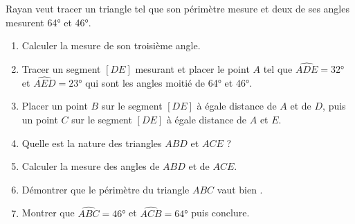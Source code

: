 \begin{Maquette}[Fiche,CorrigeFin,Colonnes=2]{}
\begin{multicols}{2}
      
      \begin{exercice}[Dur] %
         Rayan veut tracer un triangle tel que son périmètre mesure  et deux de ses angles mesurent \ang{64} et \ang{46}.
         \begin{enumerate}
            \item Calculer la mesure de son troisième angle.
            \item Tracer un segment $[DE]$ mesurant  et placer le point $A$ tel que $\widehat{ADE} =\ang{32}$ et $\widehat{AED} =\ang{23}$ qui sont les angles moitié de \ang{64} et \ang{46}.
            \item Placer un point $B$ sur le segment $[DE]$ à égale distance de $A$ et de $D$, puis un point $C$ sur le segment $[DE]$ à égale distance de $A$ et $E$. 
            \item Quelle est la nature des triangles $ABD$ et $ACE$ ?
            \item Calculer la mesure des angles de $ABD$ et de $ACE$.
            \item Démontrer que le périmètre du triangle $ABC$ vaut bien .
            \item Montrer que $\widehat{ABC} =\ang{46}$ et $\widehat{ACB} =\ang{64}$ puis conclure.
         \end{enumerate}
      \end{exercice}
      

\end{multicols}
\end{Maquette}
